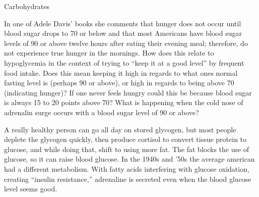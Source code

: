 \documentclass[11pt,oneside,openany,extrafontsizes]{memoir}
\begin{document}
\begin{qaexchange}{Carbohydrates}

    \begin{question}
        In one of Adele Davis' books she comments that hunger does not occur until blood sugar drops to 70 or below and that most Americans have blood sugar levels of 90 or above twelve hours after eating their evening meal; therefore, do not experience true hunger in the mornings. How does this relate to hypoglycemia in the context of trying to \enquote{keep it at a good level} by frequent food intake. Does this mean keeping it high in regards to what ones normal fasting level is (perhaps 90 or above), or high in regards to being above 70 (indicating hunger)? If one never feels hungry could this be because blood sugar is always 15 to 20 points above 70? What is happening when the cold nose of adrenalin surge occurs with a blood sugar level of 90 or above?
    \end{question}

    \begin{answer}
        A really healthy person can go all day on stored glycogen, but most people deplete the glycogen quickly, then produce cortisol to convert tissue protein to glucose, and while doing that, shift to using more fat. The fat blocks the use of glucose, so it can raise blood glucose. In the 1940s and '50s the average american had a different metabolism. With fatty acids interfering with glucose oxidation, creating \enquote{insulin resistance,} adrenaline is secreted even when the blood glucose level seems good.
    \end{answer}
\end{qaexchange}
\end{document}

